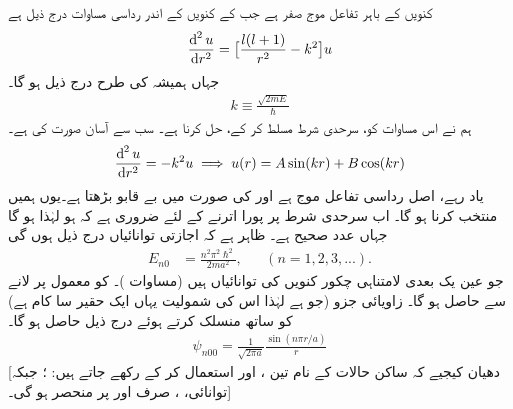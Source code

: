 \quad
کنویں  کے باہر تفاعل موج صفر ہے جب کے کنویں  کے اندر رداسی مساوات درج ذیل ہے
\begin{align}\label{مساوات_ابعادی_مربعی_کنواں_الف}
\frac{\dif^{\,2}u}{\dif r^{2}}=\big[\frac{l(l+1)}{r^{2}}-k^{2}\big]u 
\end{align}
جہاں ہمیشہ کی طرح درج ذیل ہو گا۔
\begin{align}
k\equiv\frac{\sqrt{2mE}}{\hslash} 
\end{align}
ہم نے اس مساوات کو، سرحدی شرط  مسلط کر کے، حل کرنا ہے۔ سب سے آسان صورت  کی ہے۔
\begin{align*}
\frac{\dif^{\,2}u}{\dif r^{2}}=-k^{2}u\implies {u(r)=A\sin(kr)+B\cos(kr)} 
\end{align*}
یاد رہے،  اصل رداسی تفاعل موج  ہے اور   کی صورت میں   بے قابو بڑھتا ہے۔یوں ہمیں  منتخب کرنا ہو گا۔ اب سرحدی شرط پر پورا اترنے کے لئے ضروری ہے  کہ  ہو لہٰذا    ہو گا جہاں   عدد صحیح ہے۔ ظاہر ہے کہ اجازتی توانائیاں درج ذیل ہوں گی
\begin{align}
E_{n0}&=\frac{n^{2}\pi^{2}\hslash^{2}}{2ma^{2}},&&(n=1,2,3,...). 
\end{align}
جو عین یک بعدی لامتناہی چکور کنویں  کی توانائیاں ہیں (مساوات )۔   کو معمول پر لانے سے  حاصل ہو گا۔ زاویائی جزو (جو   ہے لہٰذا اس کی شمولیت یہاں ایک حقیر سا کام ہے) کو ساتھ منسلک کرتے ہوئے درج ذیل حاصل ہو گا۔ 
\begin{align}
\psi_{n00}=\frac{1}{\sqrt{2\pi a}}\frac{\sin(n\pi r/a)}{r} 
\end{align}
[دھیان کیجیے کہ ساکن حالات کے نام تین  ،  اور  استعمال کر کے رکھے جاتے ہیں: ؛ جبکہ توانائی، ،   صرف  اور  پر منحصر ہو گی۔] 

